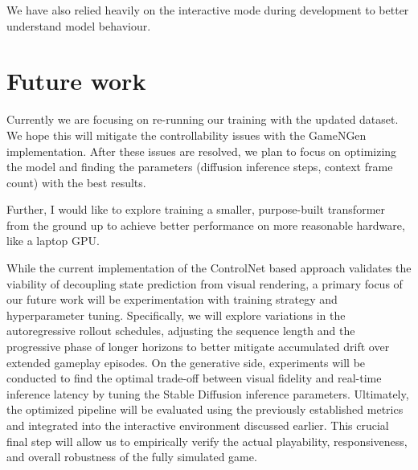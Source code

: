 \documentclass[twocolumn,a4paper]{article}
\begin{document}
We have also relied heavily on the interactive mode during development to better understand model behaviour.

\section{Future work}

Currently we are focusing on re-running our training with the updated dataset. We hope this will mitigate the controllability issues with the GameNGen implementation. After these issues are resolved, we plan to focus on optimizing the model and finding the parameters (diffusion inference steps, context frame count) with the best results.

Further, I would like to explore training a smaller, purpose-built transformer from the ground up to achieve better performance on more reasonable hardware, like a laptop GPU.

While the current implementation of the ControlNet based approach validates the viability of decoupling state prediction from visual rendering, a primary focus of our future work will be experimentation with training strategy and hyperparameter tuning. Specifically, we will explore variations in the autoregressive rollout schedules, adjusting the sequence length and the progressive phase of longer horizons to better mitigate accumulated drift over extended gameplay episodes. On the generative side, experiments will be conducted to find the optimal trade-off between visual fidelity and real-time inference latency by tuning the Stable Diffusion inference parameters. Ultimately, the optimized pipeline will be evaluated using the previously established metrics and integrated into the interactive environment discussed earlier. This crucial final step will allow us to empirically verify the actual playability, responsiveness, and overall robustness of the fully simulated game.
\end{document}
